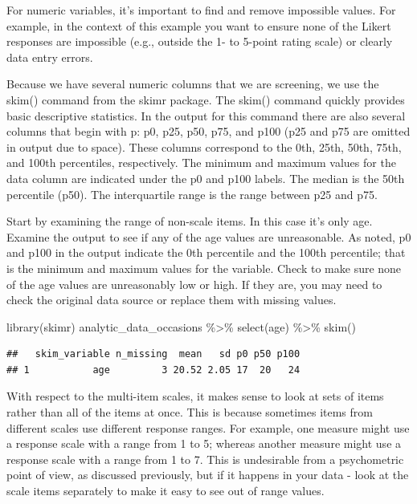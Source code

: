 \documentclass[
]{krantz}
\makeatletter
\newenvironment{Shaded}{\begin{snugshade}}{\end{snugshade}}
\newcommand{\FunctionTok}[1]{\textcolor[rgb]{0,0,0}{#1}}
\newcommand{\NormalTok}[1]{#1}
\newcommand{\SpecialCharTok}[1]{\textcolor[rgb]{0,0,0}{#1}}
\newenvironment{kframe}{%
\medskip{}
\setlength{\fboxsep}{.8em}
 \def\at@end@of@kframe{}%
 \ifinner\ifhmode%
  \def\at@end@of@kframe{\end{minipage}}%
  \begin{minipage}{\columnwidth}%
 \fi\fi%
 \def\FrameCommand##1{\hskip\@totalleftmargin \hskip-\fboxsep
 \colorbox{shadecolor}{##1}\hskip-\fboxsep
     \hskip-\linewidth \hskip-\@totalleftmargin \hskip\columnwidth}%
 \MakeFramed {\advance\hsize-\width
   \@totalleftmargin\z@ \linewidth\hsize
   \@setminipage}}%
 {\par\unskip\endMakeFramed%
 \at@end@of@kframe}
\renewenvironment{Shaded}{\begin{kframe}}{\end{kframe}}
\makeatother
\begin{document}
For numeric variables, it's important to find and remove impossible values. For example, in the context of this example you want to ensure none of the Likert responses are impossible (e.g., outside the 1- to 5-point rating scale) or clearly data entry errors.

Because we have several numeric columns that we are screening, we use the skim() command from the skimr package. The skim() command quickly provides basic descriptive statistics. In the output for this command there are also several columns that begin with p: p0, p25, p50, p75, and p100 (p25 and p75 are omitted in output due to space). These columns correspond to the 0th, 25th, 50th, 75th, and 100th percentiles, respectively. The minimum and maximum values for the data column are indicated under the p0 and p100 labels. The median is the 50th percentile (p50). The interquartile range is the range between p25 and p75.

Start by examining the range of non-scale items. In this case it's only age. Examine the output to see if any of the age values are unreasonable. As noted, p0 and p100 in the output indicate the 0th percentile and the 100th percentile; that is the minimum and maximum values for the variable. Check to make sure none of the age values are unreasonably low or high. If they are, you may need to check the original data source or replace them with missing values.

\begin{Shaded}
\begin{Highlighting}[]
\FunctionTok{library}\NormalTok{(skimr)}
\NormalTok{analytic\_data\_occasions }\SpecialCharTok{\%\textgreater{}\%}
  \FunctionTok{select}\NormalTok{(age) }\SpecialCharTok{\%\textgreater{}\%}
  \FunctionTok{skim}\NormalTok{()}
\end{Highlighting}
\end{Shaded}

\begin{verbatim}
##   skim_variable n_missing  mean   sd p0 p50 p100
## 1           age         3 20.52 2.05 17  20   24
\end{verbatim}

With respect to the multi-item scales, it makes sense to look at sets of items rather than all of the items at once. This is because sometimes items from different scales use different response ranges. For example, one measure might use a response scale with a range from 1 to 5; whereas another measure might use a response scale with a range from 1 to 7. This is undesirable from a psychometric point of view, as discussed previously, but if it happens in your data - look at the scale items separately to make it easy to see out of range values.
\end{document}
